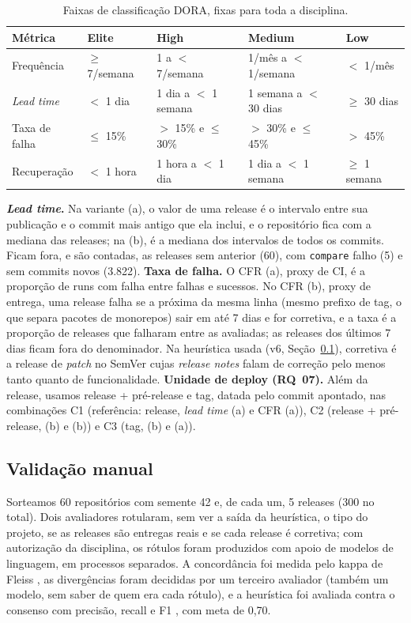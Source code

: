 \documentclass[12pt]{article}
\begin{document}
\begin{table}[t]
  \centering
  \caption{Faixas de classificação DORA, fixas para toda a disciplina.}
  \label{tab:faixas}
  \footnotesize
  \begin{tabular}{@{}lllll@{}}
    \toprule
    Métrica & Elite & High & Medium & Low \\
    \midrule
    Frequência & $\geq$ 7/semana & 1 a $<$ 7/semana & 1/mês a $<$ 1/semana & $<$ 1/mês \\
    \emph{Lead time} & $<$ 1 dia & 1 dia a $<$ 1 semana & 1 semana a $<$ 30 dias & $\geq$ 30 dias \\
    Taxa de falha & $\leq$ 15\% & $>$ 15\% e $\leq$ 30\% & $>$ 30\% e $\leq$ 45\% & $>$ 45\% \\
    Recuperação & $<$ 1 hora & 1 hora a $<$ 1 dia & 1 dia a $<$ 1 semana & $\geq$ 1 semana \\
    \bottomrule
  \end{tabular}
\end{table}

\textbf{\emph{Lead time}.} Na variante (a), o valor de uma release é o intervalo
entre sua publicação e o commit mais antigo que ela inclui, e o repositório fica
com a mediana das releases; na (b), é a mediana dos intervalos de todos os
commits. Ficam fora, e são contadas, as releases sem anterior (60), com
\texttt{compare} falho (5) e sem commits novos (3.822).
\textbf{Taxa de falha.} O CFR (a), proxy de CI, é a proporção de runs com falha
entre falhas e sucessos. No CFR (b), proxy de entrega, uma release falha se a
próxima da mesma linha (mesmo prefixo de tag, o que separa pacotes de monorepos)
sair em até 7 dias e for corretiva, e a taxa é a proporção de releases que
falharam entre as avaliadas; as releases dos últimos 7 dias ficam fora do
denominador. Na heurística usada (v6, Seção~\ref{sec:validacao}), corretiva é a
release de \emph{patch} no SemVer \cite{semver} cujas \emph{release notes}
falam de correção pelo menos tanto quanto de funcionalidade.
\textbf{Unidade de deploy (RQ~07).} Além da release, usamos release +
pré-release e tag, datada pelo commit apontado, nas combinações C1 (referência:
release, \emph{lead time} (a) e CFR (a)), C2 (release + pré-release, (b) e (b))
e C3 (tag, (b) e (a)).

\subsection{Validação manual}
\label{sec:validacao}

Sorteamos 60 repositórios com semente 42 e, de cada um, 5 releases (300 no
total). Dois avaliadores rotularam, sem ver a saída da heurística, o tipo do
projeto, se as releases são entregas reais e se cada release é corretiva; com
autorização da disciplina, os rótulos foram produzidos com apoio de modelos de
linguagem, em processos separados. A concordância foi medida pelo kappa de
Fleiss \cite{fleiss1971,seabold2010}, as divergências foram decididas por um
terceiro avaliador (também um modelo, sem saber de quem era cada rótulo), e a
heurística foi avaliada contra o consenso com precisão, recall e F1
\cite{pedregosa2011}, com meta de 0,70.
\end{document}
